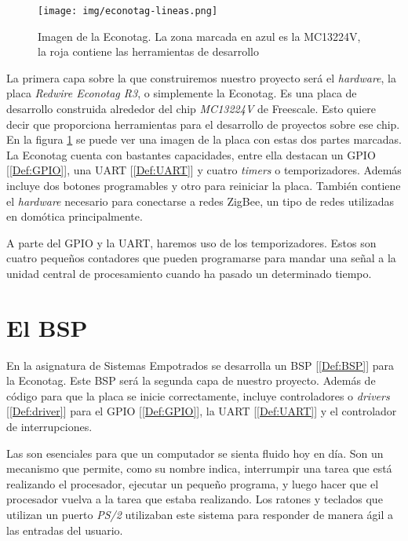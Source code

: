 \begin{figure}[!ht]
\centering
\texttt{[image: img/econotag-lineas.png]}
\caption{Imagen de la Econotag. La zona marcada en azul es la MC13224V, la roja contiene las herramientas de desarrollo}
\label{fig:econotag}
\end{figure}

La primera capa sobre la que construiremos nuestro proyecto será el \emph{hardware}, la placa \emph{Redwire Econotag R3}, o simplemente la Econotag. Es una placa de desarrollo construida alrededor del chip \emph{MC13224V} de Freescale. Esto quiere decir que proporciona herramientas para el desarrollo de proyectos sobre ese chip. En la figura \ref{fig:econotag} se puede ver una imagen de la placa con estas dos partes marcadas.\\

La Econotag cuenta con bastantes capacidades, entre ella destacan un GPIO [\ref{Def:GPIO}], una UART [\ref{Def:UART}] y cuatro \emph{timers} o temporizadores. Además incluye dos botones programables y otro para reiniciar la placa. También contiene el \emph{hardware} necesario para conectarse a redes ZigBee, un tipo de redes utilizadas en domótica principalmente.

A parte del GPIO y la UART, haremos uso de los temporizadores. Estos son cuatro pequeños contadores que pueden programarse para mandar una señal a la unidad central de procesamiento cuando ha pasado un determinado tiempo.

\section{El BSP}
En la asignatura de Sistemas Empotrados se desarrolla un BSP [\ref{Def:BSP}] para la Econotag. Este BSP será la segunda capa de nuestro proyecto. Además de código para que la placa se inicie correctamente, incluye controladores o \emph{drivers} [\ref{Def:driver}] para el GPIO [\ref{Def:GPIO}], la UART [\ref{Def:UART}] y el controlador de interrupciones.

Las  son esenciales para que un computador se sienta fluido hoy en día. Son un mecanismo que permite, como su nombre indica, interrumpir una tarea que está realizando el procesador, ejecutar un pequeño programa, y luego hacer que el procesador vuelva a la tarea que estaba realizando. Los ratones y teclados que utilizan un puerto \emph{PS/2} utilizaban este sistema para responder de manera ágil a las entradas del usuario.\\

